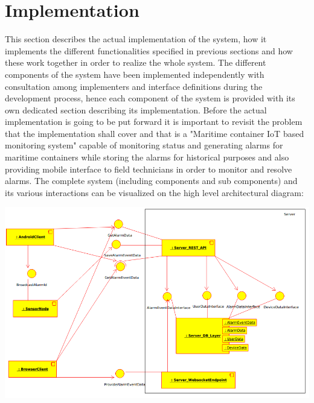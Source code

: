 \chapter{Implementation}
\label{cha:implementation}

This section describes the actual implementation of the system, how it implements the different functionalities specified in previous sections and how these work together in order to realize the whole system. The different components of the system have been implemented independently with consultation among implementers and interface definitions during the development process, hence each component of the system is provided with its own dedicated section describing its implementation. Before the actual implementation is going to be put forward it is important to revisit the problem that the implementation shall cover and that is a "Maritime container IoT based monitoring system" capable of monitoring status and generating alarms for maritime containers while storing the alarms for historical purposes and also providing mobile interface to field technicians in order to monitor and resolve alarms. The complete system (including components and sub components) and its various interactions can be visualized on the high level architectural diagram:

\bigskip
\includegraphics[scale=0.5]{gfx/Architecture}
\smallskip







